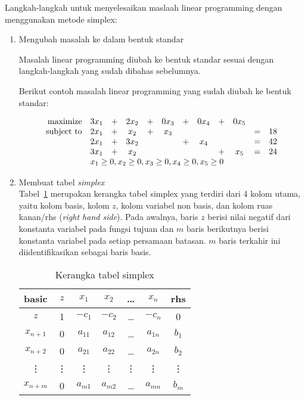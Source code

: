 Langkah-langkah untuk menyelesaikan maslaah linear programming dengan menggunakan metode simplex:

\begin{enumerate}
	\item Mengubah masalah ke dalam bentuk standar
	
        Masalah linear programming diubah ke bentuk standar sesuai dengan langkah-langkah yang sudah dibahas sebelumnya.
        
        Berikut contoh masalah linear programming yang sudah diubah ke bentuk standar:
        
	    \begin{equation*}
			\begin{array}{r c c c c c c c c c c l}
    	    	\text{maximize}   & 3x_1 & + & 2x_2 & + & 0x_3 & + & 0x_4 & + & 0x_5\\
	            \text{subject to} & 2x_1 & + & x_2  & + & x_3 &   &       &   &       & = & 18 \\
                        	   		& 2x_1 & + & 3x_2 &   &       & + & x_4 &   &       & = & 42 \\
                    	       		& 3x_1 & + & x_2  &   &       &   &       & + & x_5 & = & 24 \\
                	           		& \multicolumn{11}{l}{x_1\geq0,x_2\geq0,x_3\geq0,x_4\geq0,x_5\geq0} \\
        	\end{array}
		\end{equation*}
			
	\item Membuat tabel \textit{simplex}\\
		Tabel~\ref{tab:kerangka_tabel_simplex} merupakan kerangka tabel simplex yang terdiri dari 4 kolom utama, yaitu kolom basis, kolom $z$, kolom variabel non basis, dan kolom ruas kanan/rhs (\textit{right hand side}). Pada awalnya, baris $z$ berisi nilai negatif dari konstanta variabel pada fungsi tujuan dan $m$ baris berikutnya berisi konstanta variabel pada setiap persamaan batasan. $m$ baris terkahir ini diidentifikasikan sebagai baris basis.
        	
		\begin{table}[H]
			\centering
			\caption{Kerangka tabel simplex}
			\label{tab:kerangka_tabel_simplex}
			\begin{tabular}{|c|c|c c c c |c|}
				\hline
				basic & $z$ & $x_1$ & $x_2$ & \dots & $x_n$ & rhs \\
				\hline
				$z$ & 1 & $-c_1$ & $-c_2$ & \dots & $-c_n$ & 0 \\
				\hline
				$x_{n+1}$ & 0 & $a_{11}$ & $a_{12}$ & \dots & $a_{1n}$ & $b_1$ \\
				$x_{n+2}$ & 0 & $a_{21}$ & $a_{22}$ & \dots & $a_{2n}$ & $b_2$ \\
				\vdots & \vdots & \vdots & \vdots & \vdots & \vdots & \vdots \\
				$x_{n+m}$ & 0 & $a_{m1}$ & $a_{m2}$ & \dots & $a_{mn}$ & $b_m$ \\
				\hline
			\end{tabular}
		\end{table}
			

\end{enumerate}
